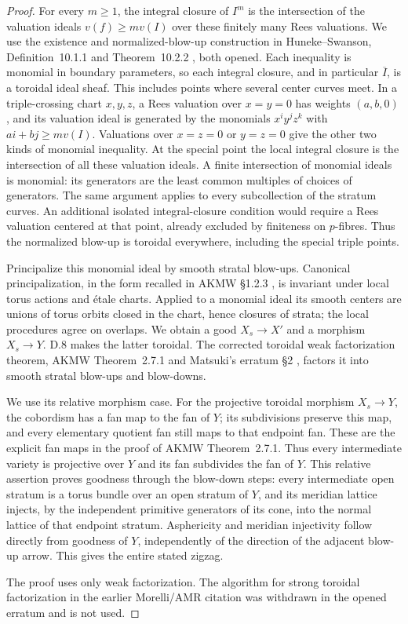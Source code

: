 \begin{proof}
For every $m\geq1$, the integral closure of $I^m$ is the intersection of the valuation ideals $v(f)\geq m v(I)$ over these finitely many Rees valuations. We use the existence and normalized-blow-up construction in Huneke--Swanson, Definition~10.1.1 and Theorem~10.2.2 \cite{HunekeSwanson2006}, both opened. Each inequality is monomial in boundary parameters, so each integral closure, and in particular $\overline I$, is a toroidal ideal sheaf. This includes points where several center curves meet. In a triple-crossing chart $x,y,z$, a Rees valuation over $x=y=0$ has weights $(a,b,0)$, and its valuation ideal is generated by the monomials $x^i y^j z^k$ with $ai+bj\geq m v(I)$. Valuations over $x=z=0$ or $y=z=0$ give the other two kinds of monomial inequality. At the special point the local integral closure is the intersection of all these valuation ideals. A finite intersection of monomial ideals is monomial: its generators are the least common multiples of choices of generators. The same argument applies to every subcollection of the stratum curves. An additional isolated integral-closure condition would require a Rees valuation centered at that point, already excluded by finiteness on $p$-fibres. Thus the normalized blow-up is toroidal everywhere, including the special triple points.

Principalize this monomial ideal by smooth stratal blow-ups. Canonical principalization, in the form recalled in AKMW \S1.2.3 \cite{AKMW2002}, is invariant under local torus actions and \'etale charts. Applied to a monomial ideal its smooth centers are unions of torus orbits closed in the chart, hence closures of strata; the local procedures agree on overlaps. We obtain a good $X_s\to X'$ and a morphism $X_s\to Y$. D.8 makes the latter toroidal. The corrected toroidal weak factorization theorem, AKMW Theorem~2.7.1 and Matsuki's erratum \S2 \cite{Matsuki2000}, factors it into smooth stratal blow-ups and blow-downs.

We use its relative morphism case. For the projective toroidal morphism $X_s\to Y$, the cobordism has a fan map to the fan of $Y$; its subdivisions preserve this map, and every elementary quotient fan still maps to that endpoint fan. These are the explicit fan maps in the proof of AKMW Theorem~2.7.1. Thus every intermediate variety is projective over $Y$ and its fan subdivides the fan of $Y$. This relative assertion proves goodness through the blow-down steps: every intermediate open stratum is a torus bundle over an open stratum of $Y$, and its meridian lattice injects, by the independent primitive generators of its cone, into the normal lattice of that endpoint stratum. Asphericity and meridian injectivity follow directly from goodness of $Y$, independently of the direction of the adjacent blow-up arrow. This gives the entire stated zigzag.

The proof uses only weak factorization. The algorithm for strong toroidal factorization in the earlier Morelli/AMR citation was withdrawn in the opened erratum and is not used.
\end{proof}

